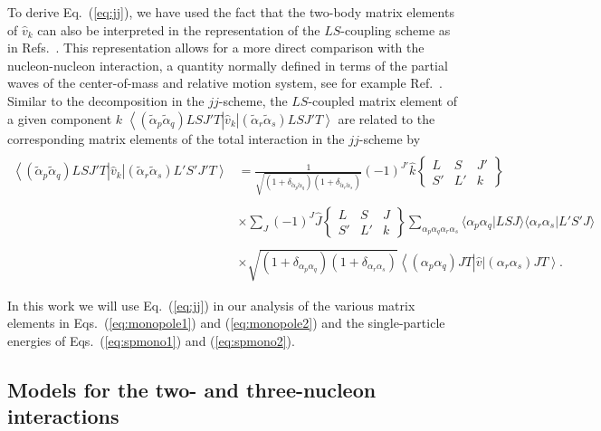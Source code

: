 \documentclass[aps,showpacs,floatfix,nofootinbib,preprintnumbers,superscriptaddress,amsmath,amssymb]{revtex4-1}
\newcommand{\bra}[1]{\left\langle #1 \right|}
\newcommand{\ket}[1]{\left| #1 \right\rangle}
\begin{document}
To derive Eq.~(\ref{eq:jj}), we have used the fact that the two-body
matrix elements of $\hat{v}_k$ can also be interpreted in the
representation of the $LS$-coupling scheme as in
Refs.~\cite{elliott1968,kirson1973,brown1988,osnes1992,richter1991,smirnova2010}. This
representation allows for a more direct comparison with the
nucleon-nucleon interaction, a quantity normally defined in terms of
the partial waves of the center-of-mass and relative motion system,
see for example Ref.~\cite{machleidt2011}.  Similar to the
decomposition in the $jj$-scheme, the $LS$-coupled matrix element of a
given component $k$ $\bra{(\tilde{\alpha}_p\tilde{\alpha}_q
  )LSJ'T}\hat{v}_{k}\ket{(\tilde{\alpha}_r\tilde{\alpha}_s )LSJ'T} $
are related to the corresponding matrix elements of the total
interaction in the $jj$-scheme by
\[
\begin{array}{ll}
&\\
\bra{(\tilde{\alpha}_p\tilde{\alpha}_q )LSJ'T}\hat{v}_{k}\ket{(\tilde{\alpha}_r\tilde{\alpha}_s )L'S'J'T}&=
{\displaystyle\frac{1}{\sqrt{(1+\delta_{\tilde{\alpha}_p\tilde{\alpha}_q})(1+\delta_{\tilde{\alpha}_r\tilde{\alpha}_s})}}}
(-1)^{J'}\hat{k}\left\{\begin{array}{ccc}L&S&J'\\S'&L'&k
\end{array}\right\}
\\&\\
&\times {\displaystyle\sum_{J}}(-1)^{J}\hat{J}\left\{\begin{array}{ccc}L&S&J\\S'&L'&k
\end{array}\right\}
{\displaystyle \sum_{\alpha_p \alpha_q \alpha_r \alpha_s}}
\langle \alpha_p\alpha_q|LSJ\rangle
\langle \alpha_r\alpha_s|L'S'J\rangle
\\&\\
&\times\sqrt{(1+\delta_{\alpha_p\alpha_q})(1+\delta_{\alpha_r\alpha_s})}\bra{(\alpha_p\alpha_q)JT}\hat{v}\ket{(\alpha_r\alpha_s)JT}
.\end{array}
\]

In this work we will use Eq.~(\ref{eq:jj}) in our analysis of the various matrix elements in Eqs.~(\ref{eq:monopole1}) 
and (\ref{eq:monopole2}) and the single-particle energies of Eqs.~(\ref{eq:spmono1})
and (\ref{eq:spmono2}).

\subsection{Models for the two- and three-nucleon interactions}\label{subsec:forcemodels}
\end{document}
